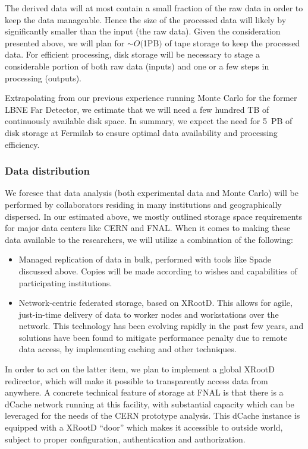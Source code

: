 The derived data will at most contain a small fraction of the raw data in order to keep the data manageable.
Hence the size of the processed data will likely by significantly smaller than the input (the raw data). 
Given the consideration presented above, we will plan for
$\sim$$ O($1PB$)$ of tape storage to keep the processed data. 
For efficient processing, disk storage will be necessary
to stage a considerable portion of both raw data (inputs) and one or a few steps in processing (outputs).

Extrapolating from our previous experience running Monte Carlo for the former LBNE Far Detector, we estimate that we will need a few hundred TB of continuously available
disk space. In summary, we expect the need for 5~PB of disk storage at Fermilab to ensure optimal data availability and 
processing efficiency. 

\subsubsection{Data distribution}
We foresee that data analysis (both experimental data and Monte Carlo) will be performed by collaborators residing in many 
institutions and geographically dispersed. In our
estimated above, we mostly outlined storage space requirements for major data centers like CERN and FNAL. When it comes to making these data available to the researchers,
we will utilize a combination of the following:
\begin{itemize}
\item Managed replication of data in bulk, performed with tools like Spade discussed above. Copies will be made according to wishes and capabilities of participating institutions.
\item Network-centric federated storage, based on XRootD. This allows for agile, just-in-time delivery of data to worker nodes and workstations over the network. This
technology has been evolving rapidly in the past few years, and solutions have been found to mitigate performance penalty due to remote data access, by implementing caching
and other techniques.
\end{itemize}

In order to act on the latter item, we plan to implement a global XRootD redirector, which will make it possible to transparently access data from anywhere.
A concrete technical feature of storage at FNAL is that there is a dCache network running at this facility, with substantial capacity which can be leveraged
for the needs of the CERN prototype analysis. This dCache instance is equipped with a XRootD ``door'' which makes it accessible to outside world, subject
to proper configuration, authentication and authorization.


